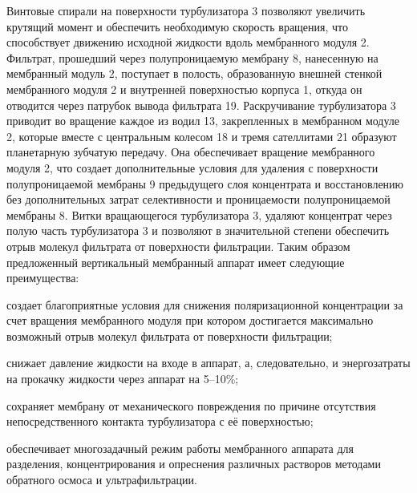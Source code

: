 Винтовые спирали на поверхности турбулизатора 3 позволяют увеличить крутящий момент и обеспечить необходимую скорость вращения, что способствует движению исходной жидкости вдоль мембранного модуля 2. 
Фильтрат, прошедший через полупроницаемую мембрану 8, нанесенную на мембранный модуль 2, поступает в полость, образованную внешней стенкой мембранного модуля 2 и внутренней поверхностью корпуса 1, откуда он отводится через патрубок вывода фильтрата 19. 
Раскручивание турбулизатора 3 приводит во вращение каждое из водил 13, закрепленных в мембранном модуле 2, которые вместе с центральным колесом 18 и тремя сателлитами 21 образуют планетарную зубчатую передачу. 
Она обеспечивает вращение мембранного модуля 2, что создает дополнительные условия для удаления с поверхности полупроницаемой мембраны 9 предыдущего слоя концентрата и восстановлению без дополнительных затрат селективности и проницаемости полупроницаемой мембраны 8. 
Витки вращающегося турбулизатора 3, удаляют концентрат через полую часть турбулизатора 3 и позволяют в значительной степени обеспечить отрыв молекул фильтрата от поверхности фильтрации. 
Таким образом предложенный вертикальный мембранный аппарат имеет следующие преимущества: 

 


создает благоприятные условия для снижения поляризационной концентрации за счет вращения мембранного модуля при котором достигается максимально возможный отрыв молекул фильтрата от поверхности фильтрации; 

снижает давление жидкости на входе в аппарат, а, следовательно, и энергозатраты на прокачку жидкости через аппарат на 5--10\%; 

сохраняет мембрану от механического повреждения по причине отсутствия непосредственного контакта турбулизатора с её поверхностью; 

обеспечивает многозадачный режим работы мембранного аппарата для разделения, концентрирования и опреснения различных растворов методами обратного осмоса и ультрафильтрации.

